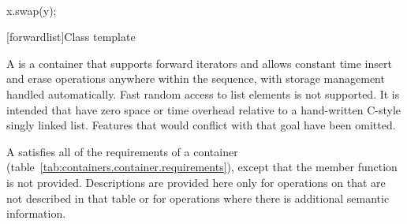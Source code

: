\documentclass[american,twoside]{book}
\begin{document}
\begin{itemdescr}
\pnum
\effects\ 
\begin{codeblock}
x.swap(y);
\end{codeblock}
\end{itemdescr}

[forwardlist]{Class template }

\pnum
A  is a container that supports forward iterators and allows constant time insert and erase operations anywhere within the sequence, with storage management handled automatically. Fast random access to list elements is not supported. \enternote It is intended that  have zero space or time overhead relative to a hand-written C-style singly linked list. Features that would conflict with that goal have been omitted.\exitnote

\pnum
A  satisfies all of the requirements of a container (table~\ref{tab:containers.container.requirements}), except that the  member function is not provided. Descriptions are provided here only for operations on  that are not described in that table or for operations where there is additional semantic information.
\end{document}
